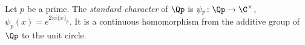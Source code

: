 Let $p$ be a prime. The \emph{standard character} of $\Qp$ is $\psi_p\colon\Qp\to\C^\times$,
$\psi_p(x)=e^{2\pi i\{x\}_p}$. It is a continuous homomorphism from the additive group of $\Qp$ to the unit circle.
